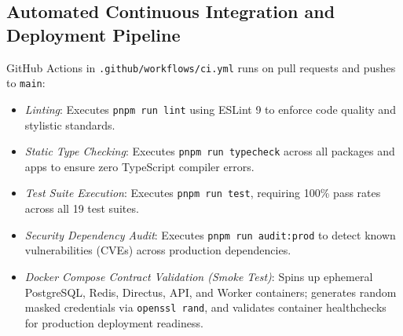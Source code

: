 \subsection{Automated Continuous Integration and Deployment Pipeline}
GitHub Actions in \texttt{.github/workflows/ci.yml} runs on pull requests and pushes to \texttt{main}:
\begin{itemize}
    \item[-] \textit{Linting}: Executes \texttt{pnpm run lint} using ESLint 9 to enforce code quality and stylistic standards.
    \item[-] \textit{Static Type Checking}: Executes \texttt{pnpm run typecheck} across all packages and apps to ensure zero TypeScript compiler errors.
    \item[-] \textit{Test Suite Execution}: Executes \texttt{pnpm run test}, requiring 100\% pass rates across all 19 test suites.
    \item[-] \textit{Security Dependency Audit}: Executes \texttt{pnpm run audit:prod} to detect known vulnerabilities (CVEs) across production dependencies.
    \item[-] \textit{Docker Compose Contract Validation (Smoke Test)}: Spins up ephemeral PostgreSQL, Redis, Directus, API, and Worker containers; generates random masked credentials via \texttt{openssl rand}, and validates container healthchecks for production deployment readiness.
\end{itemize}
